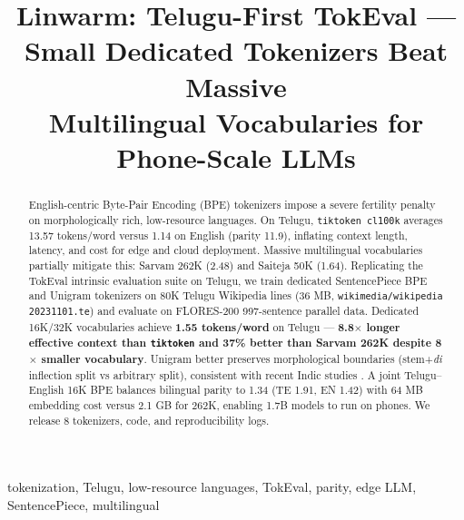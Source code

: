 \documentclass[conference]{IEEEtran}
\begin{document}
\title{Linwarm: Telugu-First TokEval --- Small Dedicated Tokenizers Beat Massive\\ Multilingual Vocabularies for Phone-Scale LLMs}

\author{
\and
{}
}

\maketitle

\begin{abstract}
English-centric Byte-Pair Encoding (BPE) tokenizers impose a severe fertility penalty on morphologically rich, low-resource languages. On Telugu, \texttt{tiktoken cl100k} averages 13.57 tokens/word versus 1.14 on English (parity 11.9), inflating context length, latency, and cost for edge and cloud deployment. Massive multilingual vocabularies partially mitigate this: Sarvam 262K (2.48) and Saiteja 50K (1.64). Replicating the TokEval intrinsic evaluation suite \cite{meister2026tokeval} on Telugu, we train dedicated SentencePiece BPE and Unigram tokenizers on 80K Telugu Wikipedia lines (36 MB, \texttt{wikimedia/wikipedia 20231101.te}) and evaluate on FLORES-200 997-sentence parallel data. Dedicated 16K/32K vocabularies achieve \textbf{1.55 tokens/word} on Telugu --- \textbf{8.8$\times$ longer effective context than \texttt{tiktoken} and 37\% better than Sarvam 262K despite 8$\times$ smaller vocabulary}. Unigram better preserves morphological boundaries (stem+\textit{di} inflection split vs arbitrary split), consistent with recent Indic studies \cite{brahma2026indic}. A joint Telugu--English 16K BPE balances bilingual parity to 1.34 (TE 1.91, EN 1.42) with 64 MB embedding cost versus 2.1 GB for 262K, enabling 1.7B models to run on phones. We release 8 tokenizers, code, and reproducibility logs.
\end{abstract}

\begin{IEEEkeywords}
tokenization, Telugu, low-resource languages, TokEval, parity, edge LLM, SentencePiece, multilingual
\end{IEEEkeywords}
\end{document}

